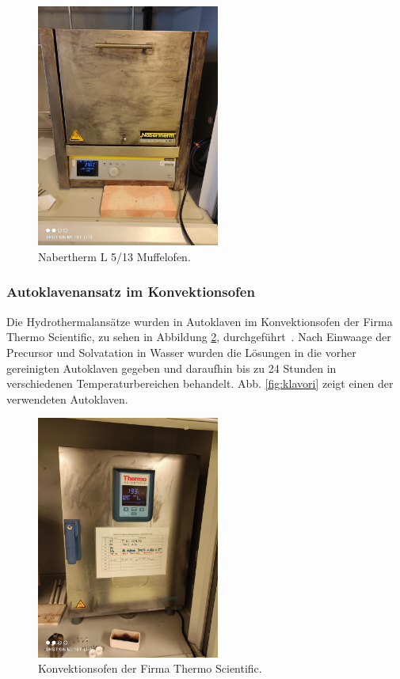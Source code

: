 \documentclass[12pt]{article}
\begin{document}
\begin{figure}[H]
    \centering
    \includegraphics[height=8cm]{Images/Ofen.jpeg}
    \caption{Nabertherm L 5/13 Muffelofen.}
    \label{fig:ofenmuffi}
\end{figure}

\subsubsection{Autoklavenansatz im Konvektionsofen}
Die Hydrothermalansätze wurden in Autoklaven im Konvektionsofen der Firma Thermo Scientific, zu sehen in Abbildung \ref{fig:ofenauto}, durchgeführt~\cite{thermofisherHerathermGeneral}.
Nach Einwaage der Precursor und Solvatation in Wasser wurden die Lösungen in die vorher gereinigten Autoklaven gegeben und daraufhin bis zu 24 Stunden in verschiedenen Temperaturbereichen behandelt.
Abb. \ref{fig:klavori} zeigt einen der verwendeten Autoklaven.

\begin{figure}[H]
    \centering
    \includegraphics[height=8cm]{Images/Konvektionsofen.jpeg}
    \caption{Konvektionsofen der Firma Thermo Scientific.}
    \label{fig:ofenauto}
\end{figure}
\end{document}
